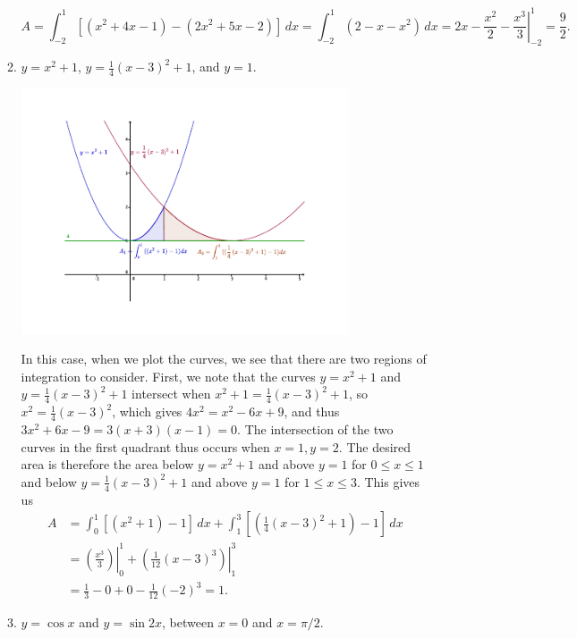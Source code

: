 \documentclass[12pt]{article}
\begin{document}
\begin{enumerate}
\begin{enumerate}
\[
 A = \int_{-2}^1[(x^2+4x-1)-(2x^2+5x-2)]\,dx = \int_{-2}^1(2-x-x^2)\,dx = \left. 2x-\frac{x^2}{2}-\frac{x^3}{3}\right|_{-2}^1 = \frac{9}{2}.
\]

\newpage

 \item $y=x^2+1$, $y=\frac{1}{4}(x-3)^2+1$, and $y=1$.

\begin{center}
 \includegraphics[width=0.8\textwidth]{WS4-1c}
\end{center}

In this case, when we plot the curves, we see that there are two regions of integration to consider. First, we note that the curves $y=x^2+1$ and $y=\frac{1}{4}(x-3)^2+1$ intersect when $x^2+1=\frac{1}{4}(x-3)^2+1$, so $x^2=\frac{1}{4}(x-3)^2$, which gives $4x^2=x^2-6x+9$, and thus $3x^2+6x-9=3(x+3)(x-1)=0$. The intersection of the two curves in the first quadrant thus occurs when $x=1, y=2$. The desired area is therefore the area below $y=x^2+1$ and above $y=1$ for $0\leq x\leq 1$ and below $y=\frac{1}{4}(x-3)^2+1$ and above $y=1$ for $1\leq x\leq 3$. This gives us
\begin{align*}
 A & = \int_0^1[(x^2+1)-1]\,dx+\int_1^3[(\frac{1}{4}(x-3)^2+1)-1]\,dx\\
& = \left.\left(\frac{x^3}{3}\right)\right|_0^1 + \left.\left(\frac{1}{12}(x-3)^3\right)\right|_1^3\\
& = \frac{1}{3}-0+0-\frac{1}{12}(-2)^3 = 1.
\end{align*}

\newpage

 \item $y=\cos x$ and $y=\sin 2x$, between $x=0$ and $x=\pi/2$.


\end{enumerate}
\end{enumerate}
\end{document}
